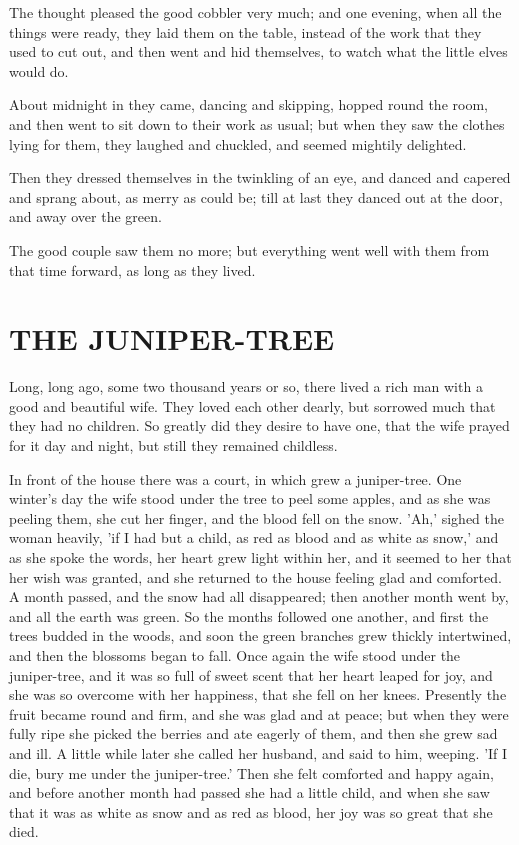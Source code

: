 \documentclass[12pt]{book}
\begin{document}
The thought pleased the good cobbler very much; and one evening, when
all the things were ready, they laid them on the table, instead of the
work that they used to cut out, and then went and hid themselves, to
watch what the little elves would do.

About midnight in they came, dancing and skipping, hopped round the
room, and then went to sit down to their work as usual; but when they
saw the clothes lying for them, they laughed and chuckled, and seemed
mightily delighted.

Then they dressed themselves in the twinkling of an eye, and danced
and capered and sprang about, as merry as could be; till at last they
danced out at the door, and away over the green.

The good couple saw them no more; but everything went well with them
from that time forward, as long as they lived.



\chapter{THE JUNIPER-TREE}

Long, long ago, some two thousand years or so, there lived a rich man
with a good and beautiful wife. They loved each other dearly, but
sorrowed much that they had no children. So greatly did they desire to
have one, that the wife prayed for it day and night, but still they
remained childless.

In front of the house there was a court, in which grew a juniper-tree.
One winter's day the wife stood under the tree to peel some apples,
and as she was peeling them, she cut her finger, and the blood fell on
the snow. 'Ah,' sighed the woman heavily, 'if I had but a child, as
red as blood and as white as snow,' and as she spoke the words, her
heart grew light within her, and it seemed to her that her wish was
granted, and she returned to the house feeling glad and comforted. A
month passed, and the snow had all disappeared; then another month
went by, and all the earth was green. So the months followed one
another, and first the trees budded in the woods, and soon the green
branches grew thickly intertwined, and then the blossoms began to
fall. Once again the wife stood under the juniper-tree, and it was so
full of sweet scent that her heart leaped for joy, and she was so
overcome with her happiness, that she fell on her knees. Presently the
fruit became round and firm, and she was glad and at peace; but when
they were fully ripe she picked the berries and ate eagerly of them,
and then she grew sad and ill. A little while later she called her
husband, and said to him, weeping. 'If I die, bury me under the
juniper-tree.' Then she felt comforted and happy again, and before
another month had passed she had a little child, and when she saw that
it was as white as snow and as red as blood, her joy was so great that
she died.
\end{document}
